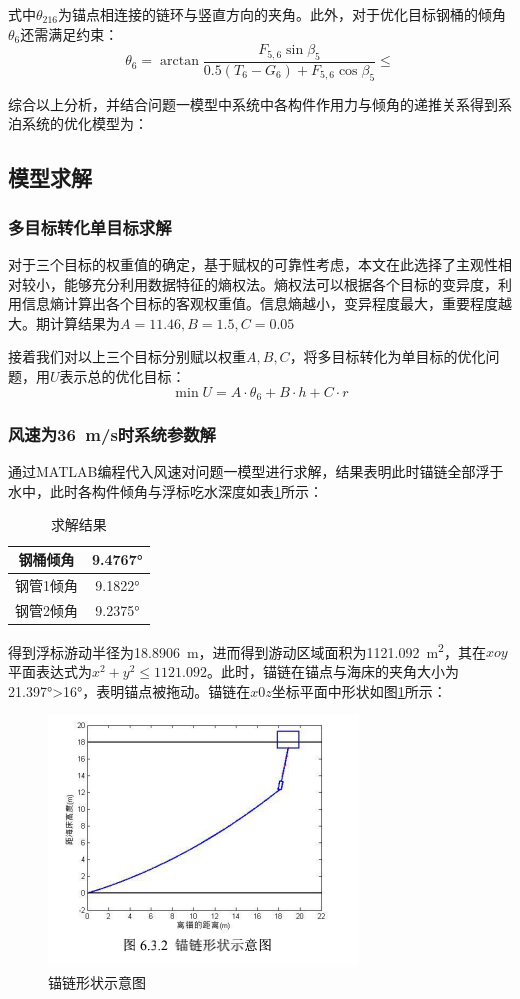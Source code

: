 \documentclass{article}
\numberwithin{equation}{subsection}
\begin{document}
式中$\theta_{216}$为锚点相连接的链环与竖直方向的夹角。此外，对于优化目标钢桶的倾角$\theta_{6}$还需满足约束：
\begin{equation}
    \theta_{6}=\arctan\frac{F_{5,6}\sin\beta_{5}}{0.5(T_{6}-G_{6})+F_{5,6}\cos\beta_{5}}\le
\end{equation}

综合以上分析，并结合问题一模型中系统中各构件作用力与倾角的递推关系得到系泊系统的优化模型为：

\subsection{模型求解}
\subsubsection{多目标转化单目标求解}
对于三个目标的权重值的确定，基于赋权的可靠性考虑，本文在此选择了主观性相对较小，能够充分利用数据特征的熵权法。熵权法可以根据各个目标的变异度，利用信息熵计算出各个目标的客观权重值。信息熵越小，变异程度最大，重要程度越大。期计算结果为$A=11.46,B=1.5,C=0.05$

接着我们对以上三个目标分别赋以权重$A,B,C$，将多目标转化为单目标的优化问题，用$U$表示总的优化目标：
$$\min U=A\cdot\theta_{6}+B\cdot h+C\cdot r$$

\subsubsection{风速为\SI{36}{m/s}时系统参数解}
通过MATLAB编程代入风速对问题一模型进行求解，结果表明此时锚链全部浮于水中，此时各构件倾角与浮标吃水深度如表\ref{求解结果3}所示：
\begin{table}[!htbp]
\centering
    \begin{tabular}{c|c}
\hline
钢桶倾角&9.4767°\\
\hline
钢管1倾角&9.1822°\\
\hline
钢管2倾角&9.2375°\\
\hline
    \end{tabular}
    \caption{求解结果}
    \label{求解结果3}
\end{table}

得到浮标游动半径为\SI{18.8906}{m}，进而得到游动区域面积为\SI{1121.092}{m^{2}}，其在$xoy$平面表达式为$x^{2}+y^{2}\le1121.092$。此时，锚链在锚点与海床的夹角大小为21.397°>16°，表明锚点被拖动。锚链在$x0z$坐标平面中形状如图\ref{锚链4}所示：
\begin{figure}[H]
  \centering
  \includegraphics[scale=0.6]{锚链4.png}
  \caption{\kaishu 锚链形状示意图}
  \label{锚链4}
\end{figure}
\end{document}
